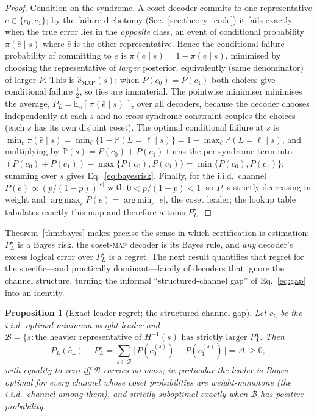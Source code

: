 \documentclass[reprint,aps,prxquantum,amsmath,amssymb,floatfix,nofootinbib,longbibliography]{revtex4-2}
\newtheorem{proposition}{Proposition}
\theoremstyle{definition}
\theoremstyle{remark}
\theoremstyle{plain}
\DeclareMathOperator*{\argmax}{arg\,max}
\DeclareMathOperator*{\argmin}{arg\,min}
\newcommand{\E}{\mathbb{E}}
\newcommand{\PP}{\mathbb{P}}
\newcommand{\calB}{\mathcal{B}}
\newcommand{\abs}[1]{\left\lvert #1 \right\rvert}
\begin{document}
\begin{proof}
Condition on the syndrome. A coset decoder commits to one representative
$e\in\{c_0,c_1\}$; by the failure dichotomy (Sec.~\ref{sec:theory_code}) it
fails exactly when the true error lies in the \emph{opposite} class, an event
of conditional probability $\pi(\bar e\mid s)$ where $\bar e$ is the other
representative. Hence the conditional failure probability of committing to $e$
is $\pi(\bar e\mid s)=1-\pi(e\mid s)$, minimised by choosing the representative
of \emph{larger} posterior, equivalently (same denominator) of larger $P$.
This is $\hat c_{\mathrm{MAP}}(s)$; when $P(c_0)=P(c_1)$ both choices give
conditional failure $\tfrac12$, so ties are immaterial. The pointwise minimiser
minimises the average, $P_L=\E_s[\,\pi(\bar e\mid s)\,]$, over all decoders,
because the decoder chooses independently at each $s$ and no cross-syndrome
constraint couples the choices (each $s$ has its own disjoint coset). The
optimal conditional failure at $s$ is
$\min_e\pi(\bar e\mid s)=\min_\ell\{1-\PP(L=\ell\mid s)\}
=1-\max_\ell\PP(L=\ell\mid s)$, and multiplying by
$\PP(s)=P(c_0)+P(c_1)$ turns the per-syndrome term into
$(P(c_0)+P(c_1))-\max\{P(c_0),P(c_1)\}=\min\{P(c_0),P(c_1)\}$; summing over $s$
gives Eq.~\eqref{eq:bayesrisk}. Finally, for the i.i.d.\ channel
$P(e)\propto(p/(1-p))^{\abs e}$ with $0<p/(1-p)<1$, so $P$ is strictly
decreasing in weight and $\argmax_e P(e)=\argmin_e\abs e$, the coset leader;
the lookup table tabulates exactly this map and therefore attains $P_L^\star$.
\end{proof}

Theorem~\ref{thm:bayes} makes precise the sense in which certification is
estimation: $P_L^\star$ is a Bayes risk, the coset-\textsc{map} decoder is its
Bayes rule, and \emph{any} decoder's excess logical error over $P_L^\star$ is a
regret. The next result quantifies that regret for the specific---and
practically dominant---family of decoders that ignore the channel structure,
turning the informal ``structured-channel gap'' of Eq.~\eqref{eq:gap} into an
identity.

\begin{proposition}[Exact leader regret; the structured-channel gap]
\label{prop:gap}
Let $\hat c_{\mathrm{L}}$ be the i.i.d.-optimal minimum-weight leader and
$\calB=\{s:\text{the heavier representative of }H^{-1}(s)\text{ has strictly
larger }P\}$. Then
\begin{equation}
  P_L(\hat c_{\mathrm{L}})-P_L^\star
   =\sum_{s\in\calB}\bigl|\,P(c_0^{(s)})-P(c_1^{(s)})\,\bigr|=\Delta\ \ge 0,
  \label{eq:gapexact}
\end{equation}
with equality to zero iff $\calB$ carries no mass; in particular the leader is
Bayes-optimal for every channel whose coset probabilities are weight-monotone
(the i.i.d.\ channel among them), and strictly suboptimal exactly when
$\calB$ has positive probability.
\end{proposition}
\end{document}
